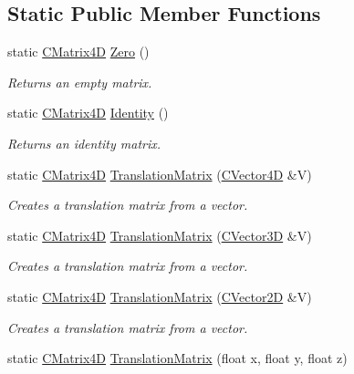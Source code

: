 \subsection*{Static Public Member Functions}
\begin{DoxyCompactItemize}
\item 
static \hyperlink{struct_c_matrix4_d}{C\+Matrix4D} \hyperlink{struct_c_matrix4_d_ad069fb805c96e3ebdc914c3e1c026c67}{Zero} ()
\begin{DoxyCompactList}\small\item\em Returns an empty matrix. \end{DoxyCompactList}\item 
static \hyperlink{struct_c_matrix4_d}{C\+Matrix4D} \hyperlink{struct_c_matrix4_d_ac8e163b22f750c4f78339597a80a9e64}{Identity} ()
\begin{DoxyCompactList}\small\item\em Returns an identity matrix. \end{DoxyCompactList}\item 
static \hyperlink{struct_c_matrix4_d}{C\+Matrix4D} \hyperlink{struct_c_matrix4_d_ae89a34e96d041aaa490eac268db93156}{Translation\+Matrix} (\hyperlink{struct_c_vector4_d}{C\+Vector4D} \&V)
\begin{DoxyCompactList}\small\item\em Creates a translation matrix from a vector. \end{DoxyCompactList}\item 
static \hyperlink{struct_c_matrix4_d}{C\+Matrix4D} \hyperlink{struct_c_matrix4_d_a528beee99ad4077a770fb83d847889ff}{Translation\+Matrix} (\hyperlink{struct_c_vector3_d}{C\+Vector3D} \&V)
\begin{DoxyCompactList}\small\item\em Creates a translation matrix from a vector. \end{DoxyCompactList}\item 
static \hyperlink{struct_c_matrix4_d}{C\+Matrix4D} \hyperlink{struct_c_matrix4_d_a7fe6f132f93c21958a5df8516e3f7195}{Translation\+Matrix} (\hyperlink{struct_c_vector2_d}{C\+Vector2D} \&V)
\begin{DoxyCompactList}\small\item\em Creates a translation matrix from a vector. \end{DoxyCompactList}\item 
static \hyperlink{struct_c_matrix4_d}{C\+Matrix4D} \hyperlink{struct_c_matrix4_d_a78e8e4e5886a36e75f6784c5a08be665}{Translation\+Matrix} (float x, float y, float z)

\end{DoxyCompactItemize}
